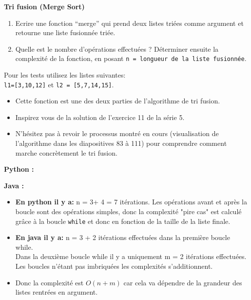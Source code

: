 \begin{Exercice} [15 minutes] \textbf{Tri fusion (Merge Sort)}
    \begin{enumerate}
        \item  Ecrire une fonction ``merge'' qui prend deux listes triées comme argument et retourne une liste fusionnée triée.
        \item Quelle est le nombre d'opérations effectuées ? Déterminer ensuite la complexité de la fonction, en posant \lstinline{n = longueur de la liste fusionnée}.
    \end{enumerate}
       
       Pour les tests utilisez les listes suivantes:\\ \lstinline{l1=[3,10,12]} et 
       \lstinline{l2 = [5,7,14,15]}.
    \begin{conseil}
    \begin{itemize}
        \item Cette fonction est une des deux parties de l'algorithme de tri fusion.
        \item Inspirez vous de la solution de l'exercice 11 de la série 5. 
        \item N'hésitez pas à revoir le processus montré en cours (visualisation de l'algorithme dans les diapositives 83 à 111) pour comprendre comment marche concrètement le tri fusion. 
    \end{itemize}
    \end{conseil}
    \begin{solution}
        \textbf{Python :}
         
    \end{solution}
    
    \begin{solution}
        \textbf{Java :}
         
    \end{solution}
    \begin{solution}
    \begin{itemize}
    \item \textbf{En python il y a:} n = 3+ 4 = 7 itérations. Les opérations avant et après la boucle sont des opérations simples, donc la complexité "pire cas" est calculé grâce à la boucle \lstinline{while} et donc en fonction de la taille de la liste finale.
    \item \textbf{En java il y a:} n = 3 + 2 itérations effectuées dans la première boucle while. \\ Dans la deuxième boucle while il y a uniquement m = 2 itérations effectuées. Les boucles n'étant pas imbriquées les complexités s'additionnent. 
    \item Donc la complexité est $O(n + m)$ car cela va dépendre de la grandeur des listes rentrées en argument.
    \end{itemize}
    \end{solution}
\end{Exercice}

